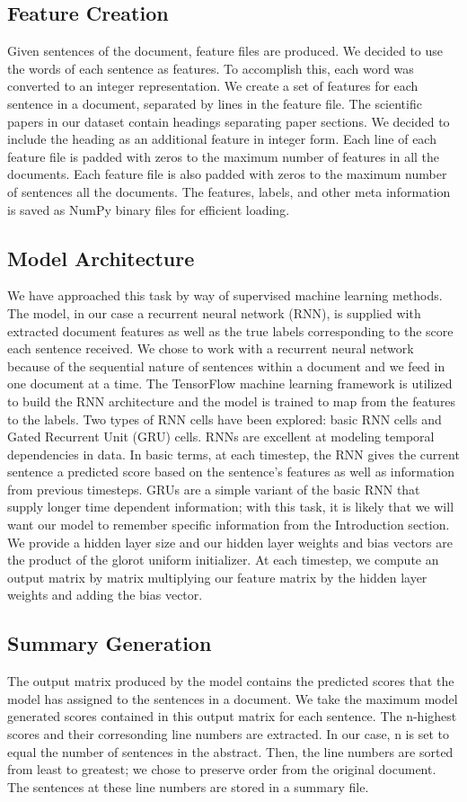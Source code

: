\documentclass[11pt]{article}
\begin{document}
	\subsection{Feature Creation}	
	Given sentences of the document, feature files are produced. We decided to use the words of each sentence as features. To accomplish this, each word was converted to an integer representation. We create a set of features for each sentence in a document, separated by lines in the feature file. The scientific papers in our dataset contain headings separating paper sections. We decided to include the heading as an additional feature in integer form. Each line of each feature file is padded with zeros to the maximum number of features in all the documents. Each feature file is also padded with zeros to the maximum number of sentences all the documents. The features, labels, and other meta information is saved as NumPy binary files for efficient loading.
	
	\subsection{Model Architecture} 
		We have approached this task by way of supervised machine learning methods. The model, in our case a recurrent neural network (RNN), is supplied with extracted document features as well as the true labels corresponding to the score each sentence received. We chose to work with a recurrent neural network because of the sequential nature of sentences within a document and we feed in one document at a time. The TensorFlow machine learning framework is utilized to build the RNN architecture and the model is trained to map from the features to the labels. Two types of RNN cells have been explored: basic RNN cells and Gated Recurrent Unit (GRU) cells. RNNs are excellent at modeling temporal dependencies in data. In basic terms, at each timestep, the RNN gives the current sentence a predicted score based on the sentence's features as well as information from previous timesteps. GRUs are a simple variant of the basic RNN that supply longer time dependent information; with this task, it is likely that we will want our model to remember specific information from the Introduction section. We provide a hidden layer size and our hidden layer weights and bias vectors are the product of the glorot uniform initializer. At each timestep, we compute an output matrix by matrix multiplying our feature matrix by the hidden layer weights and adding the bias vector. 
	\subsection{Summary Generation}
	The output matrix produced by the model contains the predicted scores that the model has assigned to the sentences in a document. We take the maximum model generated scores contained in this output matrix for each sentence. The n-highest scores and their corresonding line numbers are extracted. In our case, n is set to equal the number of sentences in the abstract. Then, the line numbers are sorted from least to greatest; we chose to preserve order from the original document. The sentences at these line numbers are stored in a summary file.
			
\end{document}
